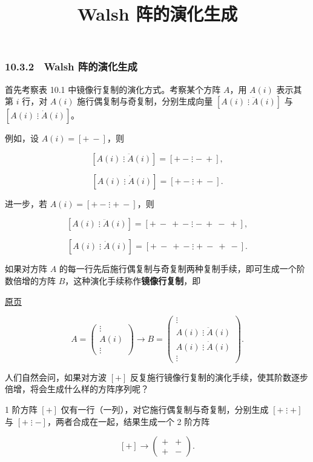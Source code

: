 \documentclass[
  10pt,
  fontset=fandol]{ctexart}
\title{Walsh 阵的演化生成}
\author{}
\date{}
\begin{document}
\maketitle

\subsubsection{10.3.2　Walsh 阵的演化生成}\label{walsh-ux9635ux7684ux6f14ux5316ux751fux6210}

首先考察表 10.1 中镜像行复制的演化方式。考察某个方阵 \(A\)，用 \(A(i)\) 表示其第 \(i\) 行，对 \(A(i)\) 施行偶复制与奇复制，分别生成向量 \([A(i)\mathrel{\vdots}\ddot A(i)]\) 与 \([A(i)\mathrel{\vdots}\dot A(i)]\)。

例如，设 \(A(i)=[+\ -]\)，则

\[
[A(i)\mathrel{\vdots}\ddot A(i)]=[+\ -\mathrel{\vdots}-\ +],
\]

\[
[A(i)\mathrel{\vdots}\dot A(i)]=[+\ -\mathrel{\vdots}+\ -].
\]

进一步，若 \(A(i)=[+\ -\mathrel{\vdots}+\ -]\)，则

\[
[A(i)\mathrel{\vdots}\ddot A(i)]=[+\ -\ +\ -\mathrel{\vdots}-\ +\ -\ +],
\]

\[
[A(i)\mathrel{\vdots}\dot A(i)]=[+\ -\ +\ -\mathrel{\vdots}+\ -\ +\ -].
\]

如果对方阵 \(A\) 的每一行先后施行偶复制与奇复制两种复制手续，即可生成一个阶数倍增的方阵 \(B\)，这种演化手续称作\textbf{镜像行复制}，即

\href{../../source-images/pdf-267.jpeg}{原页}

\[
A=\begin{pmatrix}\vdots\\A(i)\\\vdots\end{pmatrix}
\longrightarrow B=\begin{pmatrix}
\vdots\\
A(i)\mathrel{\vdots}\ddot A(i)\\
A(i)\mathrel{\vdots}\dot A(i)\\
\vdots
\end{pmatrix}.
\]

人们自然会问，如果对方波 \([+]\) 反复施行镜像行复制的演化手续，使其阶数逐步倍增，将会生成什么样的方阵序列呢？

1 阶方阵 \([+]\) 仅有一行（一列），对它施行偶复制与奇复制，分别生成 \([+\mathrel{\vdots}+]\) 与 \([+\mathrel{\vdots}-]\)，两者合成在一起，结果生成一个 2 阶方阵

\[
[+]\longrightarrow\begin{pmatrix}+&+\\+&-\end{pmatrix}.
\]
\end{document}
